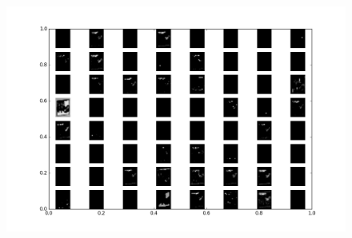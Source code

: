 \documentclass[a4paper,11pt]{article}
\begin{document}
\begin{figure}
\centering
\includegraphics[width=5.00in]{layer3_mp.png}
\end{figure}








\end{document}

